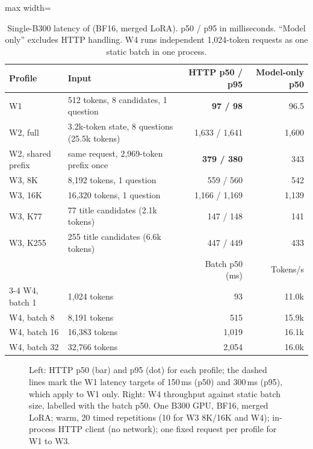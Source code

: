 \begin{table}[t]
\centering
\small
\caption{Single-B300 latency of \expone{} (BF16, merged LoRA). p50 / p95 in milliseconds.
``Model only'' excludes HTTP handling. W4 runs independent 1,024-token requests as one static
batch in one process.}
\label{tab:serving}
\setlength{\tabcolsep}{4pt}
\begin{adjustbox}{max width=\linewidth}
\begin{tabular}{@{}llrr@{}}
\toprule
Profile & Input & HTTP p50 / p95 & Model-only p50 \\
\midrule
W1 & 512 tokens, 8 candidates, 1 question & \textbf{97 / 98} & 96.5 \\
W2, full & 3.2k-token state, 8 questions (25.5k tokens) & 1,633 / 1,641 & 1,600 \\
W2, shared prefix & same request, 2,969-token prefix once & \textbf{379 / 380} & 343 \\
W3, 8K & 8,192 tokens, 1 question & 559 / 560 & 542 \\
W3, 16K & 16,320 tokens, 1 question & 1,166 / 1,169 & 1,139 \\
W3, K77 & 77 title candidates (2.1k tokens) & 147 / 148 & 141 \\
W3, K255 & 255 title candidates (6.6k tokens) & 447 / 449 & 433 \\
\midrule
 & & Batch p50 (ms) & Tokens/s \\
\cmidrule(l){3-4}
W4, batch 1 & 1,024 tokens & 93 & 11.0k \\
W4, batch 8 & 8,191 tokens & 515 & 15.9k \\
W4, batch 16 & 16,383 tokens & 1,019 & 16.1k \\
W4, batch 32 & 32,766 tokens & 2,054 & 16.0k \\
\bottomrule
\end{tabular}
\end{adjustbox}
\end{table}

\begin{figure}[t]
\centering
{}
\caption{Left: HTTP p50 (bar) and p95 (dot) for each profile; the dashed lines mark the W1
latency targets of 150\,ms (p50) and 300\,ms (p95), which apply to W1 only. Right: W4
throughput against static batch size, labelled with the batch p50. One B300 GPU, BF16, merged
LoRA; warm, 20 timed repetitions (10 for W3 8K/16K and W4); in-process HTTP client (no
network); one fixed request per profile for W1 to W3.}
\label{fig:latency}
\end{figure}

